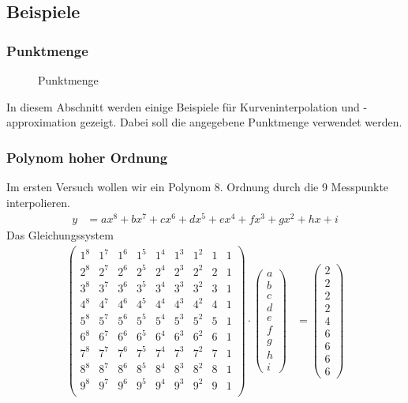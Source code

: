\documentclass[ngerman,origlongtable]{scrartcl}
\newcommand{\includepgfimage}[2]{%
\begin{figure}%
{\centering%
\caption{#2}\label{fig:#1}%
}%
\end{figure}%
}
\begin{document}
\subsection{Beispiele}
\subsubsection{Punktmenge}
\includepgfimage{../examples/test016a}{Punktmenge}
In diesem Abschnitt werden einige Beispiele für Kurveninterpolation
und -approximation gezeigt. Dabei soll die angegebene Punktmenge verwendet
werden.
\clearpage
\subsubsection{Polynom hoher Ordnung}
Im ersten Versuch wollen wir ein Polynom 8. Ordnung durch die 9 Messpunkte
interpolieren.
\begin{align*}
y&=ax^8+bx^7+cx^6+dx^5+ex^4+fx^3+gx^2+hx+i
\end{align*}
Das Gleichungssystem
\begin{align*}
\left(\begin{array}{ccccccccc}
1^8&1^7&1^6&1^5&1^4&1^3&1^2&1&1\\
2^8&2^7&2^6&2^5&2^4&2^3&2^2&2&1\\
3^8&3^7&3^6&3^5&3^4&3^3&3^2&3&1\\
4^8&4^7&4^6&4^5&4^4&4^3&4^2&4&1\\
5^8&5^7&5^6&5^5&5^4&5^3&5^2&5&1\\
6^8&6^7&6^6&6^5&6^4&6^3&6^2&6&1\\
7^8&7^7&7^6&7^5&7^4&7^3&7^2&7&1\\
8^8&8^7&8^6&8^5&8^4&8^3&8^2&8&1\\
9^8&9^7&9^6&9^5&9^4&9^3&9^2&9&1\\
\end{array}\right)\cdot\left(\begin{array}{c}a\\b\\c\\d\\e\\f\\g\\h\\i\end{array}\right)&=\left(\begin{array}{c}2\\2\\2\\2\\4\\6\\6\\6\\6\end{array}\right)
\end{align*}
\end{document}

